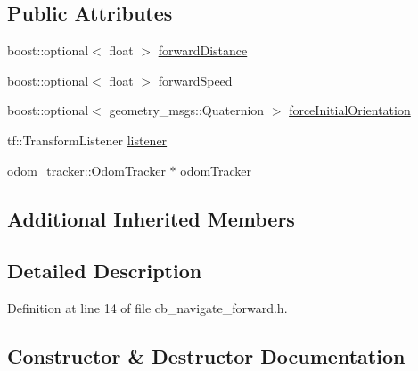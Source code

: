 \subsection*{Public Attributes}
\begin{DoxyCompactItemize}
\item 
boost\+::optional$<$ float $>$ \hyperlink{classcl__move__base__z_1_1CbNavigateForward_a41bc9c319c64be6302f7365173ccd2c5}{forward\+Distance}
\item 
boost\+::optional$<$ float $>$ \hyperlink{classcl__move__base__z_1_1CbNavigateForward_acd3a70c0886d7021f37405fb07d96cc9}{forward\+Speed}
\item 
boost\+::optional$<$ geometry\+\_\+msgs\+::\+Quaternion $>$ \hyperlink{classcl__move__base__z_1_1CbNavigateForward_ac73da1af2bca33f0927310f75d8d2e35}{force\+Initial\+Orientation}
\item 
tf\+::\+Transform\+Listener \hyperlink{classcl__move__base__z_1_1CbNavigateForward_a4fcb3933f612a0801bf373fbdeec71f5}{listener}
\item 
\hyperlink{classcl__move__base__z_1_1odom__tracker_1_1OdomTracker}{odom\+\_\+tracker\+::\+Odom\+Tracker} $\ast$ \hyperlink{classcl__move__base__z_1_1CbNavigateForward_a7583a4d669af48618bd45950db8e5292}{odom\+Tracker\+\_\+}
\end{DoxyCompactItemize}
\subsection*{Additional Inherited Members}


\subsection{Detailed Description}


Definition at line 14 of file cb\+\_\+navigate\+\_\+forward.\+h.



\subsection{Constructor \& Destructor Documentation}
\mbox{\label{classcl__move__base__z_1_1CbNavigateForward_a99ad479eeee7116e68cdb41870223eeb}} 
